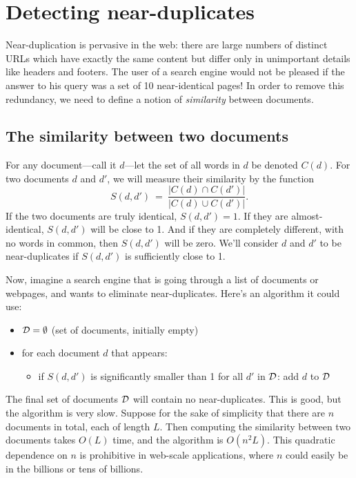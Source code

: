 \documentclass{report}
\theoremstyle{plain}
\theoremstyle{definition}
\begin{document}
\section{Detecting near-duplicates}

Near-duplication is pervasive in the web: there are large numbers of distinct URLs which have exactly
the same content but differ only in unimportant details like headers and footers. The user of a search
engine would not be pleased if the answer to his query was a set of 10 near-identical pages! In order
to remove this redundancy, we need to define a notion of {\it similarity} between documents.

\subsection{The similarity between two documents}

For any document---call it $d$---let the set of all words in $d$ be denoted $C(d)$. For two documents 
$d$ and $d'$, we will measure their similarity by the function
$$ S(d,d') \ = \ \frac{|C(d) \cap C(d')|}{|C(d) \cup C(d')|} .$$
If the two documents are truly identical, $S(d,d') = 1$. If they are almost-identical, $S(d,d')$ will
be close to 1. And if they are completely different, with no words in common, then $S(d,d')$ will be
zero. We'll consider $d$ and $d'$ to be near-duplicates if $S(d,d')$ is sufficiently close to 1.

Now, imagine a search engine that is going through a list of documents or webpages, and wants to 
eliminate near-duplicates. Here's an algorithm it could use:
\begin{itemize}
\item ${\cal D} = \emptyset$ (set of documents, initially empty)
\item for each document $d$ that appears:
\begin{itemize}
\item if $S(d,d')$ is significantly smaller than 1 for all $d'$ in ${\cal D}$: add $d$ to ${\cal D}$
\end{itemize}
\end{itemize}
The final set of documents ${\cal D}$ will contain no near-duplicates. This is good, but the
algorithm is very slow. Suppose for the sake of simplicity that there are $n$ documents in total,
each of length $L$. Then computing the similarity between two documents takes $O(L)$ time, and
the algorithm is $O(n^2L)$. This quadratic dependence on $n$ is prohibitive in web-scale applications,
where $n$ could easily be in the billions or tens of billions.
\end{document}
